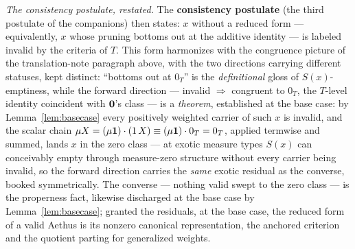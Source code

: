 \begin{defin}
\textit{The consistency postulate, restated.} The \textbf{consistency postulate} (the third postulate of the companions) then states: $x$ without a reduced form --- equivalently, $x$ whose pruning bottoms out at the additive identity --- is labeled invalid by the criteria of $T$. This form harmonizes with the congruence picture of the translation-note paragraph above, with the two directions carrying different statuses, kept distinct: ``bottoms out at $0_T$'' is the \emph{definitional} gloss of $S(x)$-emptiness, while the forward direction --- invalid $\Rightarrow$ congruent to $0_T$, the $T$-level identity coincident with $\mathbf{0}$'s class --- is a \emph{theorem}, established at the base case: by Lemma~\ref{lem:basecase} every positively weighted carrier of such $x$ is invalid, and the scalar chain $\mu X = (\mu \mathbf{1}) \cdot (1\,X) \equiv (\mu \mathbf{1}) \cdot 0_T = 0_T$, applied termwise and summed, lands $x$ in the zero class --- at exotic measure types $S(x)$ can conceivably empty through measure-zero structure without every carrier being invalid, so the forward direction carries the \emph{same} exotic residual as the converse, booked symmetrically. The converse --- nothing valid swept to the zero class --- is the properness fact, likewise discharged at the base case by Lemma~\ref{lem:basecase}; granted the residuals, at the base case, the reduced form of a valid Aethus is its nonzero canonical representation, the anchored criterion and the quotient parting for generalized weights.
\end{defin}

